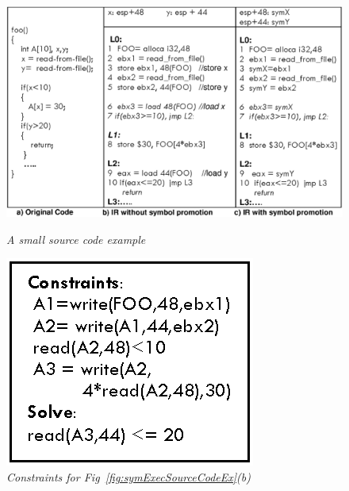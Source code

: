 \begin{figure}[t]
{
\begin{minipage}{0.68\linewidth}
\centering
{
\includegraphics[width=\linewidth]{figures/EPS/symExecution.eps}
\vspace{-2ex}
\caption{\textit{A small source code example}}
\label{fig:symExecSourceCodeEx}
}
\end{minipage}
\hfill
\begin{minipage}{0.3\linewidth}
\centering
{
\includegraphics[width=\linewidth]{figures/EPS/symExecConstraints.eps}
\vspace{-2ex}
\caption{\textit{Constraints for Fig~\ref{fig:symExecSourceCodeEx}(b)}}
\label{fig:symExecSourceConstraints}
}
\end{minipage}
\vspace{-2ex}
}
\end{figure}
